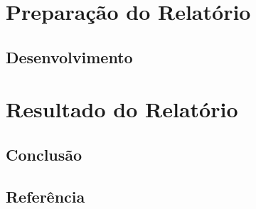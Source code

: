 \documentclass[12pt,a4paper,oneside]{memoir}
\begin{document}
\part{Preparação do Relatório}
\chapter{Desenvolvimento}
\part{Resultado do Relatório}
\chapter{Conclusão}


%
%

\chapter*{Referência}
\end{document}
